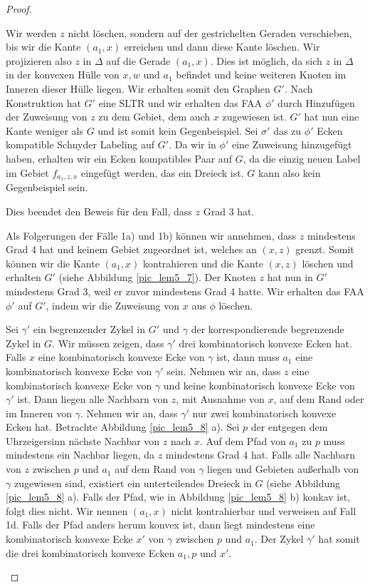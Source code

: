 \begin{proof}
\begin{description}[leftmargin =0pt, font = \rmfamily ,listparindent=\parindent,parsep=0pt]
Wir werden $z$ nicht löschen, sondern auf der gestrichelten Geraden verschieben, bis wir die Kante $(a_1,x)$ erreichen und dann diese Kante löschen. Wir projizieren also $z$ in $\Delta$ auf die Gerade $(a_1,x)$. Dies ist möglich, da sich $z$ in $\Delta$ in der konvexen Hülle von $x,w$ und $a_1$ befindet und keine weiteren Knoten im Inneren dieser Hülle liegen. Wir erhalten somit den Graphen $G'$. Nach Konstruktion hat $G'$ eine SLTR und wir erhalten das FAA $\phi'$ durch Hinzufügen der Zuweisung von $z$ zu dem Gebiet, dem auch $x$ zugewiesen ist. $G'$ hat nun eine Kante weniger als $G$ und ist somit kein Gegenbeispiel. Sei $\sigma'$ das zu $\phi'$ Ecken kompatible Schnyder Labeling auf $G'$. Da wir in $\phi'$ eine Zuweisung hinzugefügt haben, erhalten wir ein Ecken kompatibles Paar auf $G$, da die einzig neuen Label im Gebiet $f_{a_1,z,x}$ eingefügt werden, das ein Dreieck ist. $G$ kann also kein Gegenbeispiel sein.

Dies beendet den Beweis für den Fall, dass $z$ Grad 3 hat.

\item[Fall 1c:] Als Folgerungen der Fälle 1a) und 1b) können wir annehmen, dass $z$ mindestens Grad 4 hat und keinem Gebiet zugeordnet ist, welches an $(x,z)$ grenzt. Somit können wir die Kante $(a_1,x)$ kontrahieren und die Kante $(x,z)$ löschen und erhalten $G'$ (siehe Abbildung \ref{pic_lem5_7}). Der Knoten $z$ hat nun in $G'$ mindestens Grad 3, weil er zuvor mindestens Grad 4 hatte. Wir erhalten das FAA $\phi'$ auf $G'$, indem wir die Zuweisung von $x$ aus $\phi$ löschen. 

Sei $\gamma'$ ein begrenzender Zykel in $G'$ und $\gamma$ der korrespondierende begrenzende Zykel in $G$. Wir müssen zeigen, dass $\gamma'$ drei kombinatorisch konvexe Ecken hat. Falls $x$ eine kombinatorisch konvexe Ecke von $\gamma$ ist, dann muss $a_1$ eine kombinatorisch konvexe Ecke von $\gamma'$ sein. Nehmen wir an, dass $z$ eine kombinatorisch konvexe Ecke von $\gamma$ und keine kombinatorisch konvexe Ecke von $\gamma'$ ist. Dann liegen alle Nachbarn von $z$, mit Ausnahme von $x$, auf dem Rand oder im Inneren von $\gamma$. Nehmen wir an, dass $\gamma'$ nur zwei kombinatorisch konvexe Ecken hat. Betrachte Abbildung \ref{pic_lem5_8} a). Sei $p$ der entgegen dem Uhrzeigersinn nächste Nachbar von $z$ nach $x$. Auf dem Pfad von $a_1$ zu $p$ muss mindestens ein Nachbar liegen, da $z$ mindestens Grad 4 hat. Falls alle Nachbarn von $z$ zwischen $p$ und $a_1$ auf dem Rand von $\gamma$ liegen und Gebieten außerhalb von $\gamma$ zugewiesen sind, existiert ein unterteilendes Dreieck in $G$ (siehe Abbildung \ref{pic_lem5_8} a). Falls der Pfad, wie in Abbildung \ref{pic_lem5_8} b) konkav ist, folgt dies nicht. Wir nennen $(a_1,x)$ nicht kontrahierbar und verweisen auf Fall 1d. Falls der Pfad anders herum konvex ist, dann liegt mindestens eine kombinatorisch konvexe Ecke $x'$ von $\gamma$ zwischen $p$ und $a_1$. Der Zykel $\gamma'$ hat somit die drei kombinatorisch konvexe Ecken $a_1,p$ und $x'$. 


\end{description}
\end{proof}
